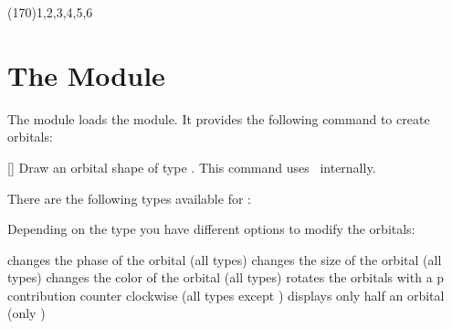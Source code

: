 \documentclass{chemmacros-manual}
\begin{document}
\begin{example}
   \newman{}
  \newman[scale=.75,ring={draw=blue,fill=blue!20}]{}
\end{example}

\begin{example}
\end{example}

\begin{example}
   \newman(170){1,2,3,4,5,6}
\end{example}

\section{The  Module}\label{sec:orbital-module}
The  module loads the  module.  It
provides the following command to create orbitals:
\begin{commands}
  []
    Draw an orbital shape of type .  This command uses \TikZ\
    internally.
\end{commands}

There are the following types available for :
\begin{center}
   \quad
   \quad
   \quad
   \quad
\end{center}

\begin{example}
      
\end{example}

Depending on the type you have different options to modify the orbitals:
\begin{options}
  \Initial{+}
    changes the phase of the orbital (all types)
    changes the size of the orbital (all types)
    changes the color of the orbital (all types)
    rotates the orbitals with a p contribution counter clockwise (all types
    except \code{s})
    displays only half an orbital (only )
\end{options}
\end{document}
